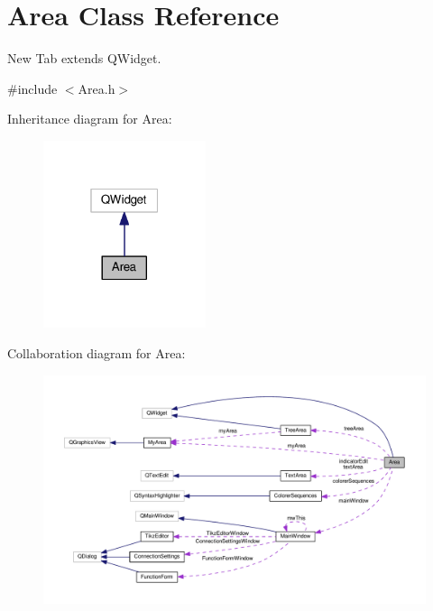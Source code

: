 \hypertarget{classArea}{\section{Area Class Reference}
\label{classArea}
}


New Tab extends Q\+Widget.  




{\ttfamily \#include $<$Area.\+h$>$}



Inheritance diagram for Area\+:\nopagebreak
\begin{figure}[H]
\begin{center}
\leavevmode
\includegraphics[width=135pt]{classArea__inherit__graph}
\end{center}
\end{figure}


Collaboration diagram for Area\+:\nopagebreak
\begin{figure}[H]
\begin{center}
\leavevmode
\includegraphics[width=350pt]{classArea__coll__graph}
\end{center}
\end{figure}
